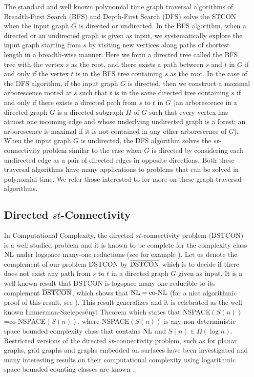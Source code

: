 \documentclass{article}
\newcommand{\NL}{\mbox{\rm NL}}
\newcommand{\coNL}{\mbox{\rm co-NL}}
\begin{document}
The standard and well known polynomial time graph traversal algorithms of Breadth-First Search (BFS) and Depth-First Search (DFS) solve the STCON when the input graph $G$ is directed or undirected. In the BFS algorithm, when a directed or an undirected graph is given as input, we systematically explore the input graph starting from $s$ by visiting new vertices along paths of shortest length in a breadth-wise manner. Here we form a directed tree called the BFS tree with the vertex $s$ as the root, and there exists a path between $s$ and $t$ in $G$ if and only if the vertex $t$ is in the BFS tree containing $s$ as the root. In the case of the DFS algorithm, if the input graph $G$ is directed, then we construct a maximal arborescence rooted at $s$ such that $t$ is in the same directed tree containing $s$ if and only if there exists a directed path from $s$ to $t$ in $G$ (an arborescence in a directed graph $G$ is a directed subgraph $H$ of $G$ such that every vertex has atmost one incoming edge and whose underlying undirected graph is a forest; an arborescence is maximal if it is not contained in any other arborescence of $G$). When the input graph $G$ is undirected, the DFS algorithm solves the $st$-connectivity problem similar to the case when $G$ is directed by considering each undirected edge as a pair of directed edges in opposite directions. Both these traversal algorithms have many applications to problems that can be solved in polynomial time. We refer those interested to \cite{CLR2022, Ski2020, KV2018} for more on these graph traversal algorithms.

\subsection{Directed $st$-Connectivity}
In Computational Complexity, the directed $st$-connectivity problem (DSTCON) is a well studied problem and it is known to be complete for the complexity class $\NL$ under logspace many-one reductions (see for example \cite[Chapter 4]{AB2009}). Let us denote the complement of our problem DSTCON by $\overline{\rm DSTCON}$ which is to decide if there does not exist any path from $s$ to $t$ in a directed graph $G$ given as input. It is a well known result that DSTCON is logspace many-one reducible to its complement $\overline{\rm DSTCON}$, which shows that $\NL =\coNL$ (for a nice algorithmic proof of this result, see \cite[Chapter 8]{Sip2013}). This result generalizes and it is celebrated as the well known Immerman-Szelepcs$\rm\acute{e}$nyi Theorem which states that NSPACE$(S(n))$=co-NSPACE$(S(n))$, where NSPACE$(S(n))$ is any non-deterministic space bounded complexity class that contains $\NL$ and $S(n)\in\Omega(\log n)$. Restricted versions of the directed $st$-connectivity problem, such as for planar graphs, grid graphs and graphs embedded on surfaces have been investigated and many interesting results on their computational complexity using logarithmic space bounded counting classes are known \cite{BTV2009, ABCDR2009}.
\end{document}
